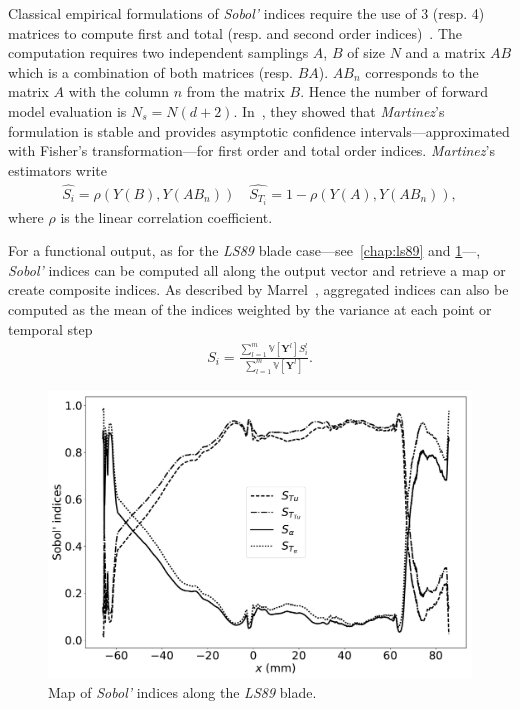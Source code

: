 Classical empirical formulations of \emph{Sobol'} indices require the use of 3 (resp. 4) matrices to compute first and total (resp. and second order indices)~\cite{Saltelli2010}. The computation requires two independent samplings $A$, $B$ of size $N$ and a matrix $AB$ which is a combination of both matrices (resp. $BA$). $AB_{n}$ corresponds to the matrix $A$ with the column $n$ from the matrix $B$. Hence the number of forward model evaluation is $N_s = N(d + 2)$. In~\citep{baudin2016}, they showed that \textit{Martinez}'s formulation is stable and provides asymptotic confidence intervals---approximated with Fisher's transformation---for first order and total order indices. \textit{Martinez}'s estimators write
\begin{align}
\hat{S_i} = \rho (Y(B), Y(AB_{n})) \quad \hat{S_{T_i}} = 1 - \rho (Y(A), Y(AB_n)),
\end{align}
\noindent where $\rho$ is the linear correlation coefficient.

For a functional output, as for the \textit{LS89} blade case---see~\cref{chap:ls89} and \cref{fig:map_sobol}---, \textit{Sobol'} indices can be computed all along the output vector and retrieve a map or create composite indices. As described by Marrel~\cite{marrel2015}, aggregated indices can also be computed as the mean of the indices weighted by the variance at each point or temporal step
\begin{align}
S_i = \frac{\displaystyle\sum_{l = 1}^{m} \mathbb{V} [\mathbf{Y}^l] S_i^{l}}{\displaystyle\sum_{l = 1}^{m} \mathbb{V} [\mathbf{Y}^l]}.
\end{align}

\begin{figure}[ht]
\centering
\includegraphics[width=0.8\linewidth,keepaspectratio]{fig/literature/sobol_map.pdf}
\caption{Map of \emph{Sobol'} indices along the \textit{LS89} blade.}
\label{fig:map_sobol}
\end{figure}

